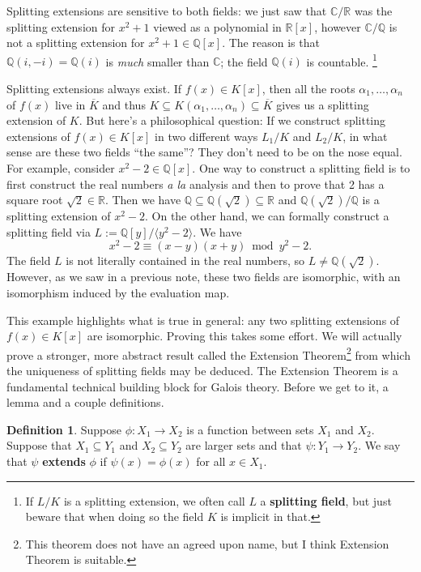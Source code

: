 \documentclass[11pt]{article}
\def\QQ{\mathbb{Q}}
\def\RR{\mathbb{R}}
\def\CC{\mathbb{C}}
\theoremstyle{definition}
\newtheorem{definition}[theorem]{Definition}
\numberwithin{equation}{subsection}
\begin{document}
Splitting extensions are sensitive to both fields: we just saw that $\CC/\RR$ was the splitting extension for $x^2 + 1$ viewed as a polynomial in $\RR[x]$, however $\CC/\QQ$ is not a splitting extension for $x^2 + 1 \in \QQ[x]$.
The reason is that $\QQ(i,-i) = \QQ(i)$ is \emph{much} smaller than $\CC$; the field $\QQ(i)$ is countable.
\footnote{
If $L/K$ is a splitting extension, we often call $L$ a \textbf{splitting field}, but just beware that when doing so the field $K$ is implicit in that. 
}

Splitting extensions always exist.
If $f(x) \in K[x]$, then all the roots $\alpha_1,\ldots, \alpha_n$ of $f(x)$ live in $\overline{K}$ and thus $K \subseteq K(\alpha_1,\ldots, \alpha_n) \subseteq \overline{K}$ gives us a splitting extension of $K$.
But here's a philosophical question:
If we construct splitting extensions of $f(x) \in K[x]$ in two different ways $L_1/K$ and $L_2/K$, in what sense are these two fields ``the same''?
They don't need to be on the nose equal.
For example, consider $x^2 - 2 \in \QQ[x]$.
One way to construct a splitting field is to first construct the real numbers \emph{a la} analysis and then to prove that 2 has a square root $\sqrt{2} \in \RR$.
Then we have $\QQ \subseteq \QQ(\sqrt{2}) \subseteq \RR$ and $\QQ(\sqrt{2})/\QQ$ is a splitting extension of $x^2 - 2$.
On the other hand, we can formally construct a splitting field via $L := \QQ[y]/\langle y^2 - 2\rangle$.
We have
\[
    x^2 - 2 \equiv (x - y)(x + y) \bmod y^2 - 2.
\]
The field $L$ is not literally contained in the real numbers, so $L \neq \QQ(\sqrt{2})$.
However, as we saw in a previous note, these two fields are isomorphic, with an isomorphism induced by the evaluation map.

This example highlights what is true in general: any two splitting extensions of $f(x) \in K[x]$ are isomorphic.
Proving this takes some effort.
We will actually prove a stronger, more abstract result called the Extension Theorem\footnote{This theorem does not have an agreed upon name, but I think Extension Theorem is suitable.} from which the uniqueness of splitting fields may be deduced.
The Extension Theorem is a fundamental technical building block for Galois theory.
Before we get to it, a lemma and a couple definitions.

\begin{definition}
    Suppose $\phi : X_1 \to X_2$ is a function between sets $X_1$ and $X_2$.
    Suppose that $X_1 \subseteq Y_1$ and $X_2 \subseteq Y_2$ are larger sets and that $\psi : Y_1 \to Y_2$.
    We say that $\psi$ \textbf{extends} $\phi$ if $\psi(x) = \phi(x)$ for all $x \in X_1$.
\end{definition}
\end{document}
